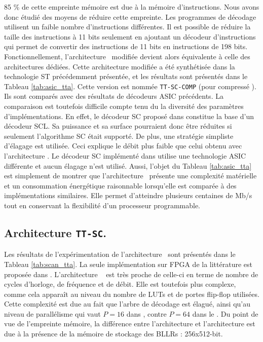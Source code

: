 85 \% de cette empreinte mémoire est due à la mémoire d'instructions. Nous avons donc étudié des moyens de réduire cette empreinte. Les programmes de décodage utilisent un faible nombre d'instructions différentes. Il est possible de réduire la taille des instructions à 11 bits seulement en ajoutant un décodeur d'instructions qui permet de convertir des instructions de 11 bits en instructions de 198 bits. Fonctionnellement, l'architecture \TTSC~modifiée devient alors équivalente à celle des architectures dédiées. Cette architecture modifiée a été synthétisée dans la technologie ST précédemment présentée, et les résultats sont présentés dans le Tableau \ref{tab:asic_tta}. Cette version est nommée \texttt{TT-SC-COMP} (pour \og compressé \fg). Ils sont comparés avec des résultats de décodeurs ASIC précédents. La comparaison est toutefois difficile compte tenu du la diversité des paramètres d'implémentations. En effet, le décodeur SC proposé dans \cite{giard_polarbear:_2017} constitue la base d'un décodeur SCL. Sa puissance et sa surface pourraient donc être réduites si seulement l'algorithme SC était supporté. De plus, une stratégie simpliste d'élagage est utilisée. Ceci explique le débit plus faible que celui obtenu avec l'architecture \TTSC. Le décodeur SC implémenté dans \cite{mishra_successive_2012} utilise une technologie ASIC différente et aucun élagage n'est utilisé. Aussi, l'objet du Tableau \ref{tab:asic_tta} est simplement de montrer que l’architecture \TTSC~présente une complexité matérielle et un consommation énergétique raisonnable lorsqu'elle est comparée à des implémentations similaires. Elle permet d'atteindre plusieurs centaines de Mb/s tout en conservant la flexibilité d'un processeur programmable.


\subsection{Architecture \texttt{TT-SC}.}

Les résultats de l'expérimentation de l'architecture \TTSCAN~sont présentés dans le Tableau \ref{tab:scan_tta}. La seule implémentation sur FPGA de la littérature est proposée dans \cite{berhault_hardware_2015}. L'architecture \TTSCAN~ est très proche de celle-ci en terme de nombre de cycles d'horloge, de fréquence et de débit. Elle est toutefois plus complexe, comme cela apparaît au niveau du nombre de LUTs et de portes flip-flop utilisées. Cette complexité est due au fait que l'arbre de décodage est élagué, ainsi qu'au niveau de parallélisme qui vaut $P=16$ dans \cite{berhault_hardware_2015}, contre $P=64$ dans le \TTSCAN. Du point de vue de l'empreinte mémoire, la différence entre l'architecture \TTSC et l'architecture \TTSCAN est due à la présence de la mémoire de stockage des BLLRs : 256x512-bit.


